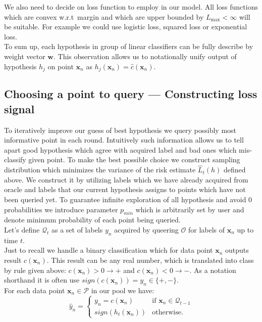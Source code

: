 \documentclass[12pt, a4paper, pdflatex, leqno]{report}
\begin{document}
We also need to decide on loss function to employ in our model. All loss functions which are convex w.r.t\ margin and which are upper bounded by $L_{\text{max}} < \infty$ will be suitable. For example we could use logistic loss, squared loss or exponential loss.\\

To sum up, each hypothesis in group of linear classifiers can be fully describe by weight vector $\mathbf{w}$. This observation allows us to notationally unify output of hypothesis $h_j$ on point $\mathbf{x}_n$ as $h_j(\mathbf{x}_n) = \hat{c}(\mathbf{x}_n)$.\\


\subsection{Choosing a point to query --- Constructing loss signal\label{sec:pointtoquery}}
To iteratively improve our guess of best hypothesis we query possibly most informative point in each round. Intuitively such information allows us to tell apart good hypothesis which agree with acquired label and bad ones which mis-classify given point. To make the best possible choice we construct sampling distribution which minimizes the variance of the risk estimate $\hat{L}_t(h)$ defined above. We construct it by utilizing labels which we have already acquired from oracle and labels that our current hypothesis assigns to points which have not been queried yet. To guarantee infinite exploration of all hypothesis and avoid $0$ probabilities we introduce parameter $p_{min}$ which is arbitrarily set by user and denote minimum probability of each point being queried.\\

Let's define $\mathscr{Q}_t$ as a set of labels $y_n$ acquired by queering $\mathscr{O}$ for labels of $\mathbf{x}_n$ up to time $t$.\\
Just to recall we handle a binary classification which for data point $\mathbf{x}_n$ outputs result $c(\mathbf{x}_n)$. This result can be any real number, which is translated into class by rule given above: $c(\mathbf{x}_n) > 0 \rightarrow +$ and $c(\mathbf{x}_n) < 0 \rightarrow -$. As a notation shorthand it is often use $\textit{sign}(c(\mathbf{x}_n)) = y_n \in \{+, -\}$.\\

For each data point $\mathbf{x}_n \in \mathscr{P}$ in our pool we have:
$$
\hat{y}_n = \begin{cases}
                                    y_n = c(\mathbf{x}_n)  & \text{if } \mathbf{x}_n \in \mathscr{Q}_{t-1} \\
                                    \textit{sign}(h_t(\mathbf{x}_n)) & \text{otherwise.}
                                  \end{cases} 
$$
\end{document}
